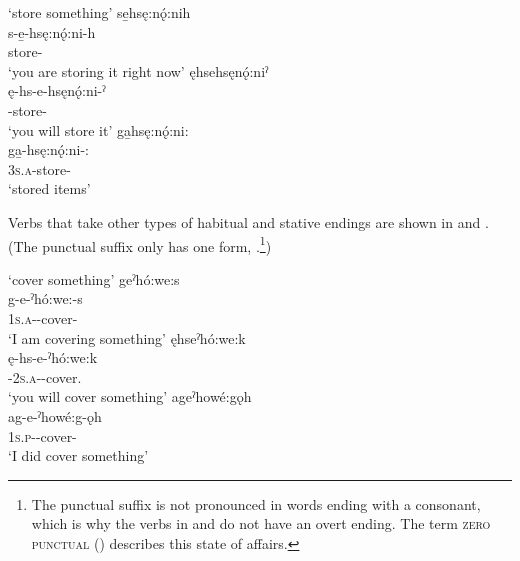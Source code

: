 \ea\label{ex:verbex93}  ‘store something’
\ea\label{ex:verbex93a} se̱hsę:nǫ́:nih\\
\gll s-e̱-hsę:nǫ́:ni-h\\
 store-{\habitual}\\
\glt `you are storing it right now'
\ex ęhsehsęnǫ́:niˀ\\\label{ex:verbex93b}
\gll ę-hs-e-hsęnǫ́:ni-ˀ\\
 \fut-store-{\punctual}\\
\glt `you will store it'
\ex ga̱hsę:nǫ́:ni:\\\label{ex:verbex93c}
\gll ga̱-hsę:nǫ́:ni-:\\
 \textsc{3s.a}-store-{\stative}\\
\glt `stored items'
\z
\z 

Verbs that take other types of habitual and stative endings are shown in  and . (The punctual suffix only has one form, .\footnote{The punctual suffix is not pronounced in words ending with a consonant, which is why the verbs in  and  do not have an overt  \textsc{\punctual} ending. The term \textsc{zero punctual} ({\zeropunctual}) describes this state of affairs.})

\ea\label{ex:verbex91}  ‘cover something’
\ea geˀhó:we:s\\\label{ex:verbex91a}
\gll g-e-ˀhó:we:-s\\
 \textsc{1s.a}-{\joinerE}-cover-{\habitual}\\
\glt `I am covering something'
\ex ęhseˀhó:we:k\\\label{ex:verbex91b}
\gll ę-hs-e-ˀhó:we:k\\
 \fut-\textsc{2s.a}-{\joinerE}-cover.{\zeropunctual}\\
\glt `you will cover something'
\ex ageˀhowé:gǫh\\\label{ex:verbex91c}
\gll ag-e-ˀhowé:g-ǫh\\
 \textsc{1s.p}-{\joinerE}-cover-{\stative}\\
\glt `I did cover something'
\z
\z

%
%
%
%


